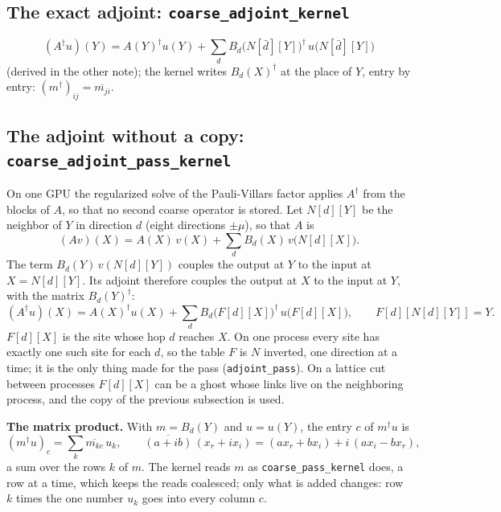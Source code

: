 \documentclass[11pt,a4paper]{article}
\numberwithin{equation}{section}
\newcommand{\code}[1]{\texttt{\small #1}}
\newcommand{\dg}{^{\dagger}}
\begin{document}
\subsection{The exact adjoint: \code{coarse\_adjoint\_kernel}}

\begin{equation}
(A\dg u)(Y) = A(Y)\dg u(Y) + \sum_d B_d\big(N[\bar d][Y]\big)\dg\,u\big(N[\bar d][Y]\big)
\end{equation}
(derived in the other note); the kernel writes $B_d(X)\dg$ at the place of $Y$, entry by entry:
$(m\dg)_{ij} = \overline{m_{ji}}$.

\subsection{The adjoint without a copy: \code{coarse\_adjoint\_pass\_kernel}}

On one GPU the regularized solve of the Pauli-Villars factor applies $A\dg$ from the blocks of
$A$, so that no second coarse operator is stored. Let $N[d][Y]$ be the neighbor of $Y$ in
direction $d$ (eight directions $\pm\mu$), so that $A$ is
\begin{equation}
(Av)(X) = A(X)\,v(X) + \sum_d B_d(X)\,v\big(N[d][X]\big).
\end{equation}
The term $B_d(Y)\,v(N[d][Y])$ couples the output at $Y$ to the input at $X=N[d][Y]$. Its
adjoint therefore couples the output at $X$ to the input at $Y$, with the matrix $B_d(Y)\dg$:
\begin{equation}
(A\dg u)(X) = A(X)\dg u(X) + \sum_d B_d\big(F[d][X]\big)\dg\,u\big(F[d][X]\big),
\qquad F[d][N[d][Y]] = Y.
\end{equation}
$F[d][X]$ is the site whose hop $d$ reaches $X$. On one process every site has exactly one such
site for each $d$, so the table $F$ is $N$ inverted, one direction at a time; it is the only
thing made for the pass (\code{adjoint\_pass}). On a lattice cut between processes $F[d][X]$ can
be a ghost whose links live on the neighboring process, and the copy of the previous subsection
is used.

\textbf{The matrix product.} With $m = B_d(Y)$ and $u = u(Y)$, the entry $c$ of $m\dg u$ is
\begin{equation}
(m\dg u)_c = \sum_k \overline{m_{kc}}\,u_k ,\qquad
\overline{(a+ib)}\,(x_r+ix_i) = (a x_r + b x_i) + i\,(a x_i - b x_r),
\end{equation}
a sum over the rows $k$ of $m$. The kernel reads $m$ as \code{coarse\_pass\_kernel} does, a row
at a time, which keeps the reads coalesced; only what is added changes: row $k$ times the one
number $u_k$ goes into every column $c$.
\end{document}

